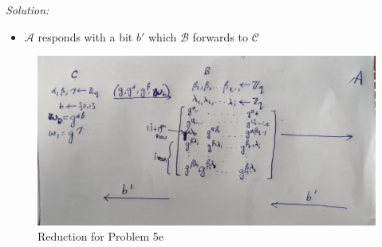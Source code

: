 \documentclass[a4paper, 11pt]{article}
\newenvironment{solution}
    {\textit{Solution:}}
    {\clearpage}
\newcommand{\calA}{\mathcal{A}}
\newcommand{\calB}{\mathcal{B}}
\newcommand{\calC}{\mathcal{C}}
\begin{document}
\begin{solution}
\begin{enumerate}[(a)]
{\begin{itemize}
                      \item $\calA$ responds with a bit $b'$ which $\calB$ forwards to $\calC$
                  \end{itemize}
              }

              \begin{figure}[!ht]
                \centering
                \includegraphics[scale=0.25]{images/Reduction5e.jpg}
                \caption{Reduction for Problem 5e}
                \label{fig:p5e}
            \end{figure}


\end{enumerate}
\end{solution}
\end{document}
